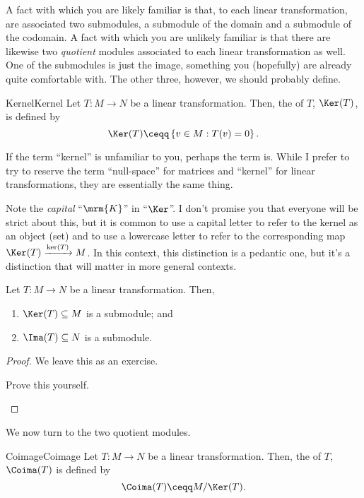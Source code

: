 A fact with which you are likely familiar is that, to each linear transformation, are associated two submodules, a submodule of the domain and a submodule of the codomain.  A fact with which you are unlikely familiar is that there are likewise two \emph{quotient} modules associated to each linear transformation as well.  One of the submodules is just the image, something you (hopefully) are already quite comfortable with.  The other three, however, we should probably define.
\begin{dfn}{Kernel}{Kernel}
Let $T\colon M\rightarrow N$ be a linear transformation.  Then, the  of $T$, $\Ker (T)$, is defined by
\begin{equation}
\Ker (T)\ceqq \left\{ v\in M:T(v)=0\right\} .
\end{equation}
\begin{rmk}
If the term ``kernel'' is unfamiliar to you, perhaps the term  is.  While I prefer to try to reserve the term ``null-space'' for matrices and ``kernel'' for linear transformations, they are essentially the same thing.
\end{rmk}
\begin{rmk}
Note the \emph{capital} ``$\mrm{K}$'' in ``$\Ker$''.    I don't promise you that everyone will be strict about this, but it is common to use a capital letter to refer to the kernel as an object (set) and to use a lowercase letter to refer to the corresponding map $\Ker (T)\xrightarrow{\ker (T)}M$.  In this context, this distinction is a pedantic one, but it's a distinction that will matter in more general contexts.
\end{rmk}
\end{dfn}
\begin{prp}{}{}
Let $T\colon M\rightarrow N$ be a linear transformation.  Then,
\begin{enumerate}
\item $\Ker (T)\subseteq M$ is a submodule; and
\item $\Ima (T)\subseteq N$ is a submodule.
\end{enumerate}
\begin{proof}
We leave this as an exercise.
\begin{exr}{}{}
Prove this yourself.
\end{exr}
\end{proof}
\end{prp}
We now turn to the two quotient modules.
\begin{dfn}{Coimage}{Coimage}
Let $T\colon M\rightarrow N$ be a linear transformation.  Then, the  of $T$, $\Coima (T)$ is defined by
\begin{equation}
\Coima (T)\ceqq M/\Ker (T).
\end{equation}
\end{dfn}
